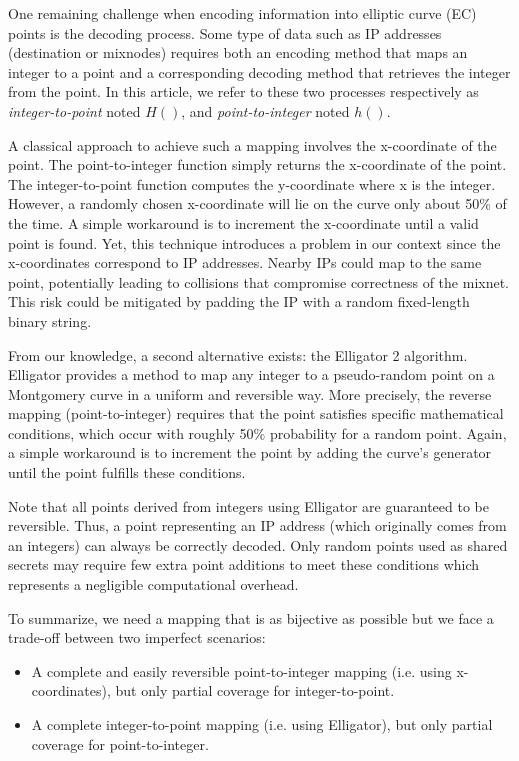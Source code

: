 One remaining challenge when encoding information into elliptic curve (EC) points is the decoding process.  
Some type of data such as IP addresses (destination or mixnodes) requires both an encoding method that maps an integer to a point and a corresponding decoding method that retrieves the integer from the point.
In this article, we refer to these two processes respectively as \textit{integer-to-point} noted $H()$, and \textit{point-to-integer} noted $h()$.
\newline

A classical approach to achieve such a mapping involves the x-coordinate of the point.
The point-to-integer function simply returns the x-coordinate of the point.
The integer-to-point function computes the y-coordinate where x is the integer.
However, a randomly chosen x-coordinate will lie on the curve only about 50\% of the time.  
A simple workaround is to increment the x-coordinate until a valid point is found.  
Yet, this technique introduces a problem in our context since the x-coordinates correspond to IP addresses. 
Nearby IPs could map to the same point, potentially leading to collisions that compromise correctness of the mixnet.
This risk could be mitigated by padding the IP with a random fixed-length binary string.
\newline

From our knowledge, a second alternative exists: the Elligator 2 algorithm.  
Elligator provides a method to map any integer to a pseudo-random point on a Montgomery curve in a uniform and reversible way.  
More precisely, the reverse mapping (point-to-integer) requires that the point satisfies specific mathematical conditions, which occur with roughly 50\% probability for a random point.  
Again, a simple workaround is to increment the point by adding the curve's generator until the point fulfills these conditions.

Note that all points derived from integers using Elligator are guaranteed to be reversible.  
Thus, a point representing an IP address (which originally comes from an integers) can always be correctly decoded.  
Only random points used as shared secrets may require few extra point additions to meet these conditions which represents a negligible computational overhead.
\newline

To summarize, we need a mapping that is as bijective as possible but we face a trade-off between two imperfect scenarios:
\begin{itemize}
    \item A complete and easily reversible point-to-integer mapping (i.e. using x-coordinates), but only partial coverage for integer-to-point.
    \item A complete integer-to-point mapping (i.e. using Elligator), but only partial coverage for point-to-integer.
\end{itemize}

